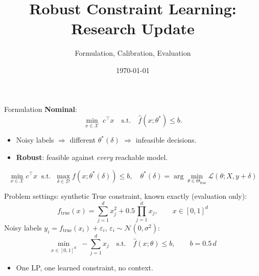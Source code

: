 \documentclass{beamer}
\title{Robust Constraint Learning: Research Update}
\subtitle{Formulation, Calibration, Evaluation}
\date{\today}
\begin{document}
\begin{frame}
  \titlepage
\end{frame}

\begin{frame}{Formulation}
  \textbf{Nominal}:
  \[
    \min_{x\in\mathcal{X}}\; c^\top x \quad\text{s.t.}\quad \hat f(x;\theta^\ast)\le b .
  \]
  \begin{itemize}
    \item Noisy labels $\Rightarrow$ different $\theta^\ast(\delta)$ $\Rightarrow$ infeasible
      decisions.
    \item \textbf{Robust}: feasible against \emph{every} reachable model.
  \end{itemize}
  \[
    \min_{x\in\mathcal{X}} c^\top x
    \;\;\text{s.t.}\;\; \max_{\delta\in\mathcal{D}} f(x;\theta^\ast(\delta))\le b,
    \quad \theta^\ast(\delta)=\arg\min_{\theta\in\Theta_{\text{feas}}}\mathcal L(\theta;X,y+\delta)
  \]
\end{frame}

\begin{frame}{Problem settings: synthetic}
  True constraint, known exactly (evaluation only):
  \[
    f_{\text{true}}(x) = \sum_{j=1}^d x_j^2 + 0.5\prod_{j=1}^d x_j, \qquad x\in[0,1]^d
  \]
  Noisy labels $y_i = f_{\text{true}}(x_i)+\varepsilon_i$,
  $\varepsilon_i\sim\mathcal N(0,\sigma^2)$:
  \[
    \min_{x\in[0,1]^d} \; -\sum_{j=1}^d x_j \quad\text{s.t.}\quad \hat f(x;\theta)\le b,
    \qquad b=0.5\,d
  \]
  \begin{itemize}
    \item One LP, one learned constraint, no context.
  \end{itemize}
\end{frame}
\end{document}
